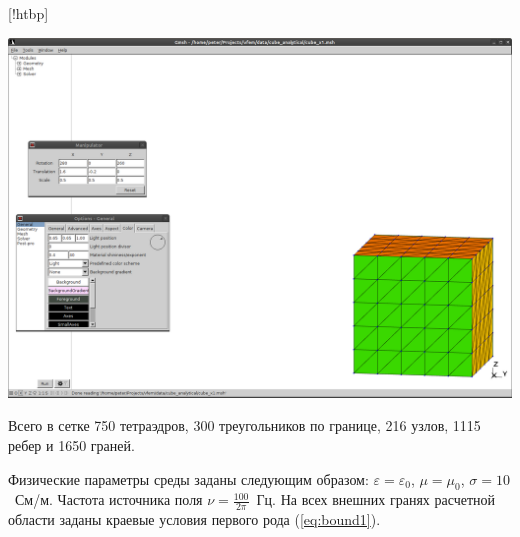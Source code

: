 \documentclass[a4paper,14pt]{article}
\makeatletter
\renewenvironment{figure}[1][\fps@figure]{
  \edef\@tempa{\noexpand\@float{figure}[#1]}
  \@tempa
  \addtocounter{foofigure}{1}
}{
  \end@float
}
\makeatother
\begin{document}
\begin{figure}[!htbp]
	\centering
	\includegraphics[trim=387mm 20mm 5mm 220mm,clip,scale=0.4]{verify/x1.png}
	\caption{конечноэлементная сетка для верификации}
	\label{fig:verify:x1}
\end{figure}

\noindent Всего в сетке 750 тетраэдров, 300 треугольников по границе, 216 узлов, 1115 ребер и 1650 граней.

Физические параметры среды заданы следующим образом: $\varepsilon = \varepsilon_0$, $\mu = \mu_0$, $\sigma = 10$~См/м. Частота источника поля $\nu = \frac{100}{2 \pi}$~Гц. На всех внешних гранях расчетной области заданы краевые условия первого рода (\ref{eq:bound1}).

\end{document}
